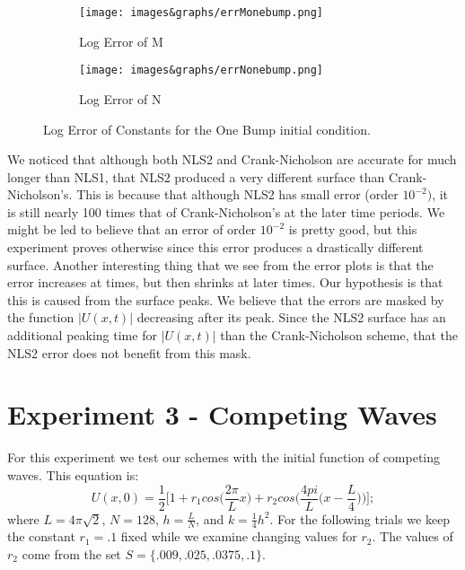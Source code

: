\documentclass[11pt, oneside]{article}   	%
\begin{document}
\begin{figure}[H]
    \begin{subfigure}{0.5\textwidth}
        \centering\captionsetup{width=.85\linewidth}%
        \texttt{[image: images\&graphs/errMonebump.png]}
        \caption{Log Error of M}
        \label{NLS1 Mesh}
    \end{subfigure}
    \begin{subfigure}{0.5\textwidth}
        \centering\captionsetup{width=.85\linewidth}%
        \texttt{[image: images\&graphs/errNonebump.png]}
        \caption{Log Error of N}
        \label{NLS1 Constants of Motion}
    \end{subfigure}
\caption{Log Error of Constants for the One Bump initial condition.}
\label{fig:image2}
\end{figure}
We noticed that although both NLS2 and Crank-Nicholson are accurate for much longer than NLS1, that NLS2 produced a very different surface than Crank-Nicholson's. This is because that although NLS2 has small error (order $10^{-2})$, it is still nearly 100 times that of Crank-Nicholson's at the later time periods. We might be led to believe that an error of order $10^{-2}$ is pretty good, but this experiment proves otherwise since this error produces a drastically different surface.
\newline
Another interesting thing that we see from the error plots is that the error increases at times, but then shrinks at later times. Our hypothesis is that this is caused from the surface peaks. We believe that the errors are masked by the function $|U(x,t)|$ decreasing after its peak. Since the NLS2 surface has an additional peaking time for $|U(x,t)|$ than the Crank-Nicholson scheme, that the NLS2 error does not benefit from this mask. 

\section{Experiment 3 - Competing Waves}
For this experiment we test our schemes with the initial function of competing waves. This equation is:
\begin{equation*}
    U(x,0) = \frac{1}{2}\Bigg[1 + r_1cos\bigg(\frac{2\pi}{L}x\bigg) + r_2cos\bigg(\frac{4pi}{L}\Big(x-\frac{L}{4}\Big)\bigg)\Bigg];
\end{equation*}
where $L = 4\pi\sqrt{2}$, $N = 128$, $h = \frac{L}{N}$, and $k = \frac{1}{4}h^2$. For the following trials we keep the constant $r_1 = .1$ fixed while we examine changing values for $r_2$. The values of $r_2$ come from the set $S = \{.009,.025,.0375,.1\}$.
\end{document}
